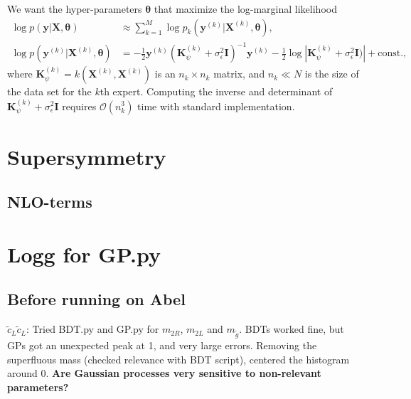 \documentclass[twoside,english]{uiofysmaster}
\begin{document}
We want the hyper-parameters $\boldsymbol{\theta}$ that maximize the log-marginal likelihood
\begin{align}\label{Eq:: DGP log-marginal likelihood}
\log p(\textbf{y}|\textbf{X}, \boldsymbol{\theta}) &\approx \sum_{k=1}^M \log p_k (\textbf{y}^{(k)}|\textbf{X}^{(k)}, \boldsymbol{\theta}),\\
\log p (\textbf{y}^{(k)}| \textbf{X}^{(k)}, \boldsymbol{\theta}) &= - \frac{1}{2} \textbf{y}^{(k)} (\textbf{K}_{\psi}^{(k)} + \sigma_{\epsilon}^2 \textbf{I})^{-1} \textbf{y}^{(k)} - \frac{1}{2} \log |\textbf{K}_{\psi}^{(k)} + \sigma_{\epsilon}^2 \textbf{I})| + \text{const.},
\end{align}
where $\textbf{K}_{\psi}^{(k)}= k(\textbf{X}^{(k)}, \textbf{X}^{(k)})$ is an $n_k \times n_k$ matrix, and $n_k \ll N$ is the size of the data set for the $k$th expert. Computing the inverse and determinant of $\textbf{K}_{\psi}^{(k)} + \sigma_{\epsilon}^2 \textbf{I}$ requires $\mathcal{O}(n_k^3)$ time with standard implementation.













\chapter{Supersymmetry}

\section{NLO-terms}














\chapter{Logg for GP.py}
\section{Before running on Abel}
$\tilde{c}_L \tilde{c}_L$: Tried BDT.py and GP.py for $m_{2R}$, $m_{2L}$ and $m_{\tilde{g}}$. BDTs worked fine, but GPs got an unexpected peak at 1, and very large errors. Removing the superfluous mass (checked relevance with BDT script), centered the histogram around $0$. \textbf{Are Gaussian processes very sensitive to non-relevant parameters?} 
\end{document}

